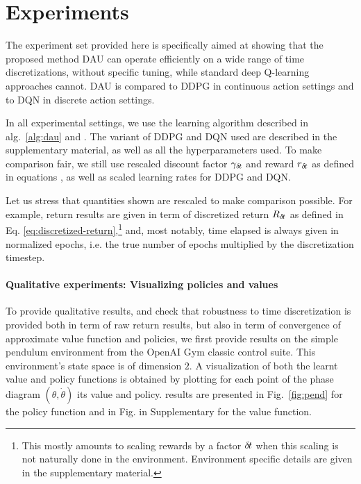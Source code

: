 \section{Experiments}
\label{sec:exp}

The experiment set provided here is specifically aimed at showing that
the proposed method DAU can operate efficiently on a wide range of time
discretizations, without specific tuning, while standard deep Q-learning
approaches cannot. DAU is compared to DDPG in continuous action settings and to DQN in
discrete action settings. 

In all experimental settings, we use the learning algorithm described in
alg.~\ref{alg:dau} and . The variant of DDPG and DQN
used are described in the supplementary material, as well as all the hyperparameters
used. To make comparison fair, we still use rescaled discount factor $\gamma_{\delta\hspace{-.1em}t}$ and reward $r_{\delta\hspace{-.1em}t}$  as defined in equations , as well as scaled learning rates for DDPG and DQN.

Let us stress that quantities shown are rescaled to make comparison possible. For example,
return results are given in term of discretized return $R_{\delta\hspace{-.1em}t}$ as defined in Eq. \eqref{eq:discretized-return},\footnote{This mostly amounts to scaling rewards
by a factor ${\delta\hspace{-.1em}t}$ when this scaling is not naturally done in the environment. Environment specific
details are given in the supplementary material.} and, most notably, time elapsed is always given in
normalized epochs, i.e. the true number of epochs multiplied by the discretization timestep.


\paragraph{Qualitative experiments: Visualizing policies and values}
To provide qualitative results, and check that robustness to time
discretization is provided both in term of raw return results, but also in term
of convergence of approximate value function and policies, we first provide results on the simple pendulum environment
from the OpenAI Gym classic control suite.  This environment's state space is of dimension $2$. A visualization of both the learnt value and policy functions is obtained by plotting for each point of the phase diagram $(\theta, \dot{\theta})$ its value and policy. results are presented in
Fig.~\ref{fig:pend} for the policy function and in Fig. in Supplementary  for the value function.

